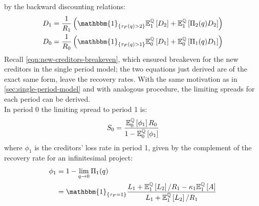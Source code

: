 \documentclass[main.tex]{subfiles}
\begin{document}
        by the backward discounting relations:
        \begin{align*}
            D_{1} 
            &= 
            \frac{1}{R_{1}} 
            \left(
                \mathbbm{1}_{\{\tau_{F}(q) > 2\}} 
                \mathbb{E}_{1}^{\rnmeasure}\left[D_{2}\right] 
                +
                \mathbb{E}_{1}^{\rnmeasure}\left[\Pi_{2}(q)D_{2}\right] 
            \right) \\
            D_{0} 
            &= 
            \frac{1}{R_{0}} 
            \left(
                \mathbbm{1}_{\{\tau_{F}(q) > 1\}} 
                \mathbb{E}_{0}^{\rnmeasure}\left[D_{1}\right] 
                +
                \mathbb{E}_{0}^{\rnmeasure}\left[\Pi_{1}(q)D_{1}\right] 
            \right)
        \end{align*}
        Recall \cref{eqn:new-creditors-breakeven}, 
        which ensured breakeven for the new creditors in the single period model;
        the two equations just derived are of the exact same form, leave the recovery rates. 
        With the same motivation as in \cref{sec:single-period-model} and with analogous procedure,
        the limiting spreads for each period can be derived.
        \\
        In period 0 the limiting spread to period 1 is:
        \begin{equation*}
            S_0 =
            \frac{
                \mathbb{E}_{0}^{\mathbb{Q}}\left[\phi_1\right]R_0
            }{
                1 - \mathbb{E}_{0}^{\mathbb{Q}}\left[\phi_1\right] 
            }
        \end{equation*}
        where $\phi_{1}$ is the creditors' loss rate in period 1,
        given by the complement of the recovery rate for an infinitesimal project:
        \begin{align*}
            \phi_1 
            &=
            1 - \lim_{q\rightarrow0} \Pi_{1}(q) 
            \nonumber \\
            &=
            \mathbbm{1}_{\{\tau_{F}=1\}}
            \frac{
                L_{1}
                +
                \mathbb{E}_{1}^{\rnmeasure}\left[L_{2}\right]/R_1 
                - 
                \kappa_{1}\mathbb{E}_{1}^{\rnmeasure}\left[A\right]
            }{
                L_{1} + \mathbb{E}_{1}^{\rnmeasure}\left[L_{2}\right]/R_1
            }
        \end{align*}
        
\end{document}
